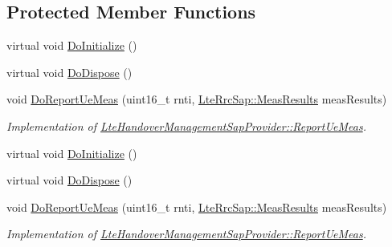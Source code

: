\subsection*{Protected Member Functions}
\begin{DoxyCompactItemize}
\item 
virtual void \hyperlink{classns3_1_1NoOpHandoverAlgorithm_a55dc3900d7b3301b6efe19117aff2d06}{Do\+Initialize} ()
\item 
virtual void \hyperlink{classns3_1_1NoOpHandoverAlgorithm_a3f17fe716d6d081826322270e8d7b3ab}{Do\+Dispose} ()
\item 
void \hyperlink{classns3_1_1NoOpHandoverAlgorithm_a9aaa12980d64b132c36cec892eecec64}{Do\+Report\+Ue\+Meas} (uint16\+\_\+t rnti, \hyperlink{structns3_1_1LteRrcSap_1_1MeasResults}{Lte\+Rrc\+Sap\+::\+Meas\+Results} meas\+Results)
\begin{DoxyCompactList}\small\item\em Implementation of \hyperlink{classns3_1_1LteHandoverManagementSapProvider_a5daca6a055e4f8794f7f1e8ba1077b15}{Lte\+Handover\+Management\+Sap\+Provider\+::\+Report\+Ue\+Meas}. \end{DoxyCompactList}\item 
virtual void \hyperlink{classns3_1_1NoOpHandoverAlgorithm_adeca51d3fd564198e9ceabb0db241937}{Do\+Initialize} ()
\item 
virtual void \hyperlink{classns3_1_1NoOpHandoverAlgorithm_a6ab8ea0f5dc79b50fe89844d5ae69e96}{Do\+Dispose} ()
\item 
void \hyperlink{classns3_1_1NoOpHandoverAlgorithm_a9aaa12980d64b132c36cec892eecec64}{Do\+Report\+Ue\+Meas} (uint16\+\_\+t rnti, \hyperlink{structns3_1_1LteRrcSap_1_1MeasResults}{Lte\+Rrc\+Sap\+::\+Meas\+Results} meas\+Results)
\begin{DoxyCompactList}\small\item\em Implementation of \hyperlink{classns3_1_1LteHandoverManagementSapProvider_a5daca6a055e4f8794f7f1e8ba1077b15}{Lte\+Handover\+Management\+Sap\+Provider\+::\+Report\+Ue\+Meas}. \end{DoxyCompactList}\end{DoxyCompactItemize}
